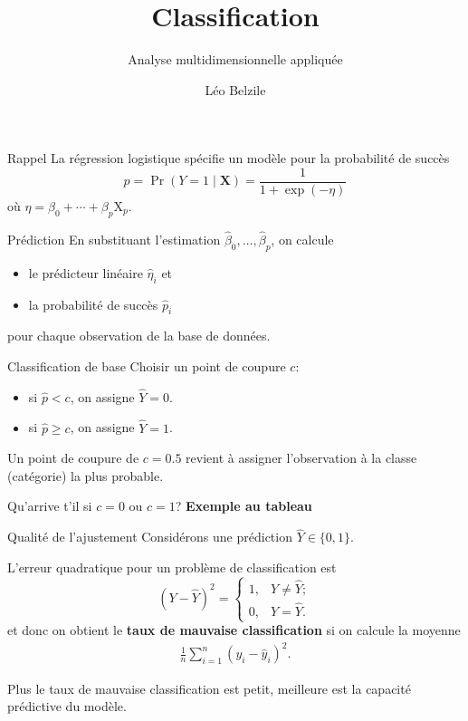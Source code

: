 \documentclass[
  ignorenonframetext,
]{beamer}
\title{Classification}
\subtitle{Analyse multidimensionnelle appliquée}
\author{Léo Belzile}
\date{}
\institute{HEC Montréal}
\providecommand{\tightlist}{%
  \setlength{\itemsep}{0pt}\setlength{\parskip}{0pt}}\usepackage{longtable,booktabs,array}
\begin{document}
\frame{\titlepage}
\ifdefined\Shaded\renewenvironment{Shaded}{\begin{tcolorbox}[sharp corners, frame hidden, breakable, boxrule=0pt, interior hidden, borderline west={3pt}{0pt}{shadecolor}, enhanced]}{\end{tcolorbox}}\fi

\begin{frame}{Rappel}
\protect\hypertarget{rappel}{}
La régression logistique spécifie un modèle pour la probabilité de
succès \[p = \Pr(Y=1 \mid \mathbf{X}) = \frac{1}{1+\exp(-\eta)}\] où
\(\eta = \beta_0 + \cdots + \beta_p \mathrm{X}_p\).
\end{frame}

\begin{frame}{Prédiction}
\protect\hypertarget{pruxe9diction}{}
En substituant l'estimation
\(\widehat{\beta}_0, \ldots, \widehat{\beta}_p\), on calcule

\begin{itemize}
\tightlist
\item
  le prédicteur linéaire \(\widehat{\eta}_i\) et
\item
  la probabilité de succès \(\widehat{p}_i\)
\end{itemize}

pour chaque observation de la base de données.
\end{frame}

\begin{frame}{Classification de base}
\protect\hypertarget{classification-de-base}{}
Choisir un point de coupure \(c\):

\begin{itemize}
\tightlist
\item
  si \(\widehat{p} < c\), on assigne \(\widehat{Y}=0\).
\item
  si \(\widehat{p} \geq c\), on assigne \(\widehat{Y}=1\).
\end{itemize}

Un point de coupure de \(c=0.5\) revient à assigner l'observation à la
classe (catégorie) la plus probable.

Qu'arrive t'il si \(c=0\) ou \(c=1\)? \textbf{Exemple au tableau}
\end{frame}

\begin{frame}{Qualité de l'ajustement}
\protect\hypertarget{qualituxe9-de-lajustement}{}
Considérons une prédiction \(\widehat{Y} \in \{0,1\}\).

L'erreur quadratique pour un problème de classification est
\[(Y-\widehat{Y})^2 = \begin{cases} 1, & Y \neq \widehat{Y}; \\0, & Y = \widehat{Y}.\end{cases}\]
et donc on obtient le \textbf{taux de mauvaise classification} si on
calcule la moyenne \begin{align*}
\frac{1}{n} \sum_{i=1}^n (y_i - \widehat{y}_i)^2.
\end{align*}

Plus le taux de mauvaise classification est petit, meilleure est la
capacité prédictive du modèle.
\end{frame}
\end{document}
